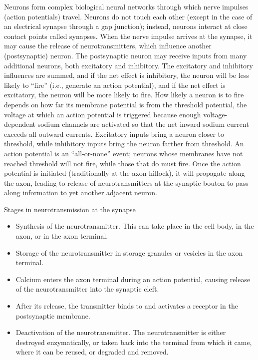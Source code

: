 \documentclass[]{book}
\providecommand{\tightlist}{%
  \setlength{\itemsep}{0pt}\setlength{\parskip}{0pt}}
\begin{document}
Neurons form complex biological neural networks through which nerve impulses (action potentials) travel. Neurons do not touch each other (except in the case of an electrical synapse through a gap junction); instead, neurons interact at close contact points called synapses. When the nerve impulse arrives at the synapse, it may cause the release of neurotransmitters, which influence another (postsynaptic) neuron. The postsynaptic neuron may receive inputs from many additional neurons, both excitatory and inhibitory. The excitatory and inhibitory influences are summed, and if the net effect is inhibitory, the neuron will be less likely to ``fire'' (i.e., generate an action potential), and if the net effect is excitatory, the neuron will be more likely to fire. How likely a neuron is to fire depends on how far its membrane potential is from the threshold potential, the voltage at which an action potential is triggered because enough voltage-dependent sodium channels are activated so that the net inward sodium current exceeds all outward currents. Excitatory inputs bring a neuron closer to threshold, while inhibitory inputs bring the neuron farther from threshold. An action potential is an ``all-or-none'' event; neurons whose membranes have not reached threshold will not fire, while those that do must fire. Once the action potential is initiated (traditionally at the axon hillock), it will propagate along the axon, leading to release of neurotransmitters at the synaptic bouton to pass along information to yet another adjacent neuron.

Stages in neurotransmission at the synapse

\begin{itemize}
\tightlist
\item
  Synthesis of the neurotransmitter. This can take place in the cell body, in the axon, or in the axon terminal.
\item
  Storage of the neurotransmitter in storage granules or vesicles in the axon terminal.
\item
  Calcium enters the axon terminal during an action potential, causing release of the neurotransmitter into the synaptic cleft.
\item
  After its release, the transmitter binds to and activates a receptor in the postsynaptic membrane.
\item
  Deactivation of the neurotransmitter. The neurotransmitter is either destroyed enzymatically, or taken back into the terminal from which it came, where it can be reused, or degraded and removed.
\end{itemize}
\end{document}
